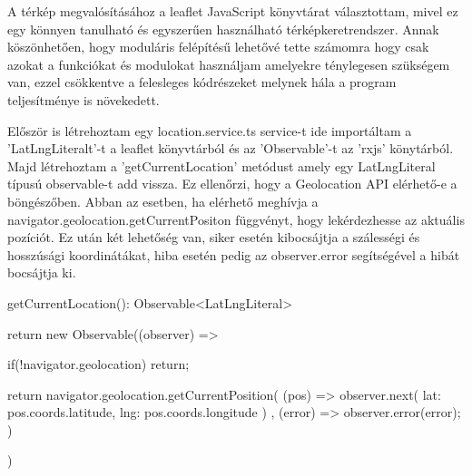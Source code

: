 A térkép megvalósításához a leaflet JavaScript könyvtárat választottam, mivel ez egy könnyen tanulható és egyszerűen használható térképkeretrendszer. Annak köszönhetően, hogy moduláris felépítésű lehetővé tette számomra hogy csak azokat a funkciókat és modulokat használjam amelyekre ténylegesen szükségem van, ezzel csökkentve a felesleges kódrészeket melynek hála a program teljesítménye is növekedett. 

Először is létrehoztam egy location.service.ts service-t ide importáltam a ’LatLngLiteralt’-t a leaflet könyvtárból és az ’Observable’-t az ’rxjs’ könytárból. Majd létrehoztam a ’getCurrentLocation’ metódust amely egy LatLngLiteral típusú observable-t add vissza. Ez ellenőrzi, hogy a Geolocation API elérhető-e a böngészőben. Abban az esetben, ha elérhető meghívja a navigator.geolocation.getCurrentPositon függvényt, hogy lekérdezhesse az aktuális pozíciót. Ez után két lehetőség van, siker esetén kibocsájtja a szálességi és hosszúsági koordinátákat, hiba esetén pedig az observer.error segítségével a hibát bocsájtja ki.

\begin{python}[caption={Aktuális lokáció megadása},captionpos=b]
    getCurrentLocation(): Observable<LatLngLiteral>{
    return new Observable((observer) => {
      if(!navigator.geolocation) return;

      return navigator.geolocation.getCurrentPosition(
        (pos) => {
          observer.next({
            lat: pos.coords.latitude,
            lng: pos.coords.longitude
          })
        },
        (error) => {
          observer.error(error);
        }
      )
    })
  }
\end{python}

